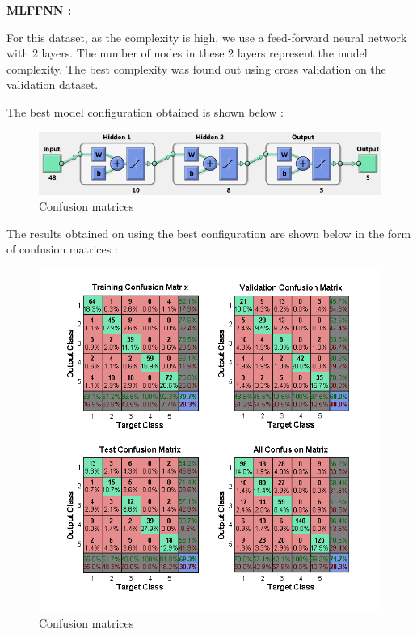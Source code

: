 \documentclass{article}
\begin{document}
\begin{flushleft}
\textbf{MLFFNN :} \\[10pt]
\begin{flushleft}

For this dataset, as the complexity is high, we use a feed-forward neural network with 2 layers.  The number of nodes in these 2 layers represent the model complexity. The best complexity was found out using cross validation on the validation dataset. 

The best model configuration obtained is shown below :

\end{flushleft}

\begin{figure}[H]
\centering
\includegraphics[width=\linewidth]{Classification/images/net_config.png}
\caption{Confusion matrices}
\end{figure}




The results obtained on using the best configuration are shown below in the form of confusion matrices :


\begin{figure}[H]
\centering
\includegraphics[width=\linewidth]{Classification/images/confusion.png}
\caption{Confusion matrices}
\end{figure}


\end{flushleft}
\end{document}
